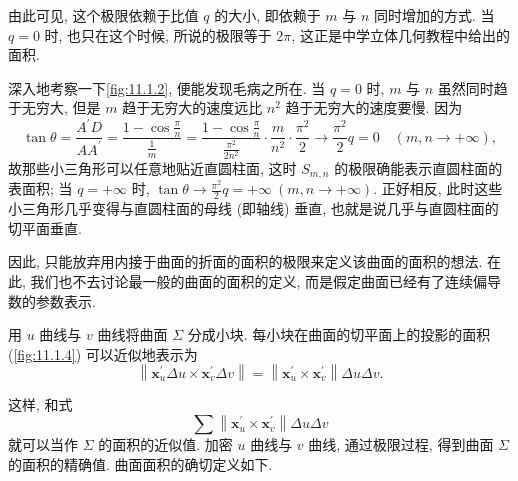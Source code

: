 由此可见, 这个极限依赖于比值 $q$ 的大小, 即依赖于 $m$ 与 $n$ 同时增加的方式. 当 $q=0$ 时, 也只在这个时候, 所说的极限等于 $2 \pi$, 这正是中学立体几何教程中给出的面积.

深入地考察一下\cref{fig:11.1.2}, 便能发现毛病之所在. 当 $q=0$ 时, $m$ 与 $n$ 虽然同时趋于无穷大, 但是 $m$ 趋于无穷大的速度远比 $n^{2}$ 趋于无穷大的速度要慢. 因为
\[
  \tan \theta=\frac{A^{\prime} D}{A A^{\prime}}=\frac{1-\cos \frac{\pi}{n}}{\frac{1}{m}}=\frac{1-\cos \frac{\pi}{n}}{\frac{\pi^{2}}{2 n^{2}}} \cdot \frac{m}{n^{2}} \cdot \frac{\pi^{2}}{2} \to \frac{\pi^{2}}{2} q=0 \quad(m, n \to+\infty),
\]
故那些小三角形可以任意地贴近直圆柱面, 这时 $S_{m, n}$ 的极限确能表示直圆柱面的表面积; 当 $q=+\infty$ 时, $\tan \theta \to \frac{\pi^{2}}{2} q=+\infty \ (m, n \to+\infty)$. 正好相反, 此时这些小三角形几乎变得与直圆柱面的母线 (即轴线) 垂直, 也就是说几乎与直圆柱面的切平面垂直.

因此, 只能放弃用内接于曲面的折面的面积的极限来定义该曲面的面积的想法. 在此, 我们也不去讨论最一般的曲面的面积的定义, 而是假定曲面已经有了连续偏导数的参数表示.

用 $u$ 曲线与 $v$ 曲线将曲面 $\Sigma$ 分成小块. 每小块在曲面的切平面上的投影的面积\allowbreak (\cref{fig:11.1.4}) 可以近似地表示为
\[
  \left\|\boldsymbol{x}_{u}^{\prime} \Delta u \times \boldsymbol{x}_{v}^{\prime} \Delta v\right\|=\left\|\boldsymbol{x}_{u}^{\prime} \times \boldsymbol{x}_{v}^{\prime}\right\| \Delta u \Delta v.
\]

这样, 和式
\[
  \sum\left\|\boldsymbol{x}_{u}^{\prime} \times \boldsymbol{x}_{v}^{\prime}\right\| \Delta u \Delta v
\]
就可以当作 $\Sigma$ 的面积的近似值. 加密 $u$ 曲线与 $v$ 曲线, 通过极限过程, 得到曲面 $\Sigma$ 的面积的精确值. 曲面面积的确切定义如下.

